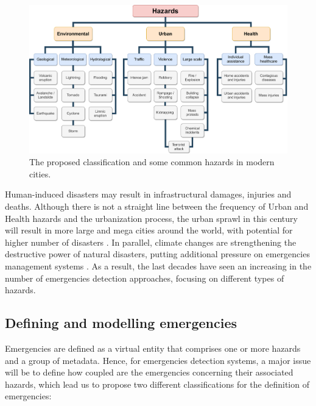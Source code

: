 \begin{refsection}
\begin{figure}[htbp]
\centering
\includegraphics[width=\linewidth]{Chapters/1-Survey/images/Hazards.pdf}
\caption{The proposed classification and some common hazards in modern cities.}
\label{Fig:hazards}
\end{figure}

Human-induced disasters may result in infrastructural damages, injuries and deaths. Although there is not a straight line between the frequency of Urban and Health hazards and the urbanization process, the urban sprawl in this century will result in more large and mega cities around the world, with potential for higher number of disasters \cite{urbansprawl1,urbansprawl2}. In parallel, climate changes are strengthening the destructive power of natural disasters, putting additional pressure on emergencies management systems \cite{enviroment1,enviroment2}. As a result, the last decades have seen an increasing in the number of emergencies detection approaches, focusing on different types of hazards. 

\subsection{Defining and modelling emergencies}

Emergencies are defined as a virtual entity that comprises one or more hazards and a group of metadata. Hence, for emergencies detection systems, a major issue will be to define how coupled are the emergencies concerning their associated hazards, which lead us to propose two different classifications for the definition of emergencies:


\end{refsection}
